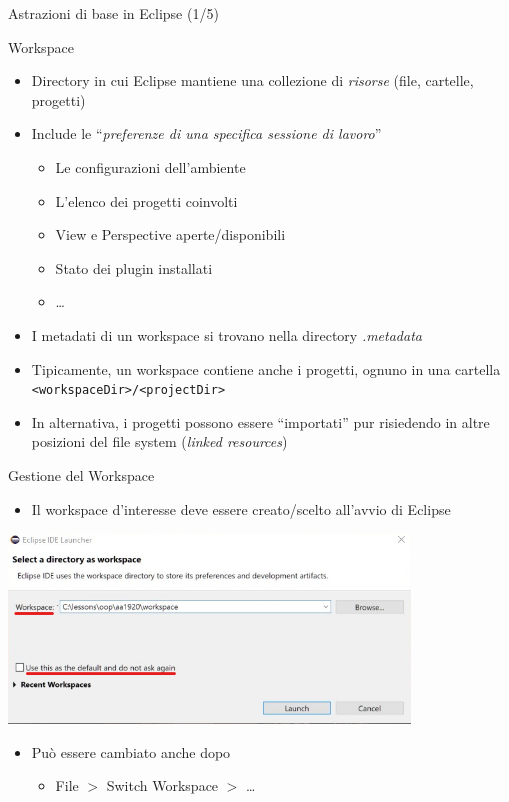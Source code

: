 \documentclass[xcolor=dvipsnames,presentation]{beamer}
\begin{document}
\begin{frame}{Astrazioni di base in Eclipse (1/5)}
\begin{block}{Workspace}
\begin{itemize}
\item Directory in cui Eclipse mantiene una collezione di \emph{risorse} (file, cartelle, progetti)
\item Include le ``\emph{preferenze di una specifica sessione di lavoro}''
\begin{itemize}
\item Le configurazioni dell'ambiente
\item L'elenco dei progetti coinvolti
\item View e Perspective aperte/disponibili
\item Stato dei plugin installati
\item \dots
\end{itemize}
\item I metadati di un workspace si trovano nella directory \emph{.metadata}
\item Tipicamente, un workspace contiene anche i progetti, ognuno in una cartella \texttt{<workspaceDir>/<projectDir>}
\item In alternativa, i progetti possono essere ``importati'' pur risiedendo in altre posizioni del file system (\emph{linked resources})
\end{itemize}
\end{block}
\end{frame}

\begin{frame}{Gestione del Workspace}
\begin{itemize}
\item Il workspace d'interesse deve essere creato/scelto all'avvio di Eclipse
\end{itemize}
\begin{center}
\includegraphics[width=0.8\textwidth]{img/eclipse-screenshots/eclipse-ide-00.png}
\end{center}
\begin{itemize}
\item Può essere cambiato anche dopo
\begin{itemize}
\item File $>$ Switch Workspace $>$ \dots
\end{itemize}
\end{itemize}
\end{frame}
\end{document}
